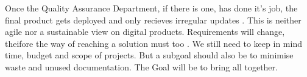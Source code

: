 Once the Quality Assurance Department, if there is one, has done it's job, the final product gets deployed and only recieves irregular updates \citep{ratcliffe2011agile:18}. This is neither agile nor a sustainable view on digital products. \newline
Requirements will change, theifore the way of reaching a solution must too \citep{ratcliffe2011agile:30:31}.  
\newline \newline 
We still need to keep in mind time, budget and scope of projects. But a subgoal should also be to minimise waste and unused documentation. The Goal will be to bring all together.


%
%
%
